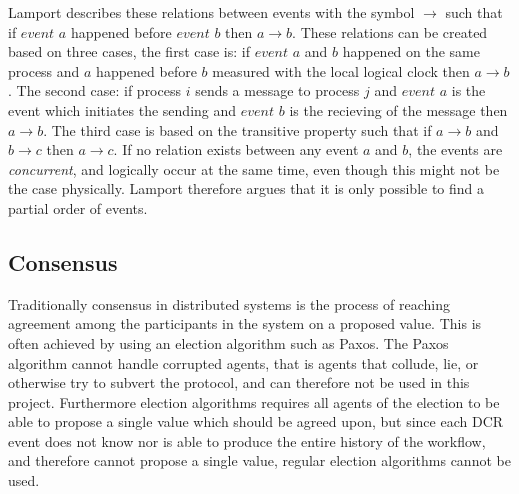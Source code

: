 		\newpar Lamport describes these relations between events with the symbol $\rightarrow$ such that if $event$ $a$ happened before $event$ $b$ then $a \rightarrow b$. These relations can be created based on three cases, the first case is: if $event$ $a$ and $b$ happened on the same process and $a$ happened before $b$ measured with the local logical clock then $a \rightarrow b$. The second case: if process $i$ sends a message to process $j$ and $event$ $a$ is the event which initiates the sending and $event$ $b$ is the recieving of the message then $a \rightarrow b$. The third case is based on the transitive property such that if $a \rightarrow b$ and $b \rightarrow c$ then $a \rightarrow c$. If no relation exists between any event $a$ and $b$, the events are \textit{concurrent}, and logically occur at the same time, even though this might not be the case physically. Lamport therefore argues that it is only possible to find a partial order of events.
		
		
		\subsection{Consensus}
		Traditionally consensus in distributed systems is the process of reaching agreement among the participants in the system on a proposed value. This is often achieved by using an election algorithm such as Paxos\cite{Lamport:1998:PP:279227.279229}. The Paxos algorithm cannot handle corrupted agents, that is agents that collude, lie, or otherwise try to subvert the protocol, and can therefore not be used in this project. Furthermore election algorithms requires all agents of the election to be able to propose a single value which should be agreed upon, but since each DCR event does not know nor is able to produce the entire history of the workflow, and therefore cannot propose a single value, regular election algorithms cannot be used.
		
        
